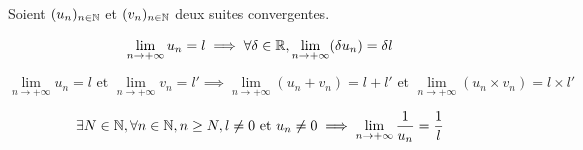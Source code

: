 \documentclass[a4paper, 12pt]{article}
\begin{document}
\begin{proposition}
    Soient $(u_n)_{n \in \mathbb{N}}$ et $(v_n)_{n \in \mathbb{N}}$ deux suites convergentes.

    \item
    $$
    \lim_{n \to +\infty} u_n = l \implies \forall \delta \in \mathbb{R}, \lim_{n \to +\infty}(\delta u_n) = \delta l
    $$
    
    \item
    $$
    \lim_{n \to +\infty} u_n = l \text{ et } \lim_{n \to +\infty} v_n = l' \implies \lim_{n \to +\infty}(u_n + v_n) = l + l' \text{ et } \lim_{n \to +\infty}(u_n \times v_n) = l \times l'
    $$
    
    \item
    $$
    \exists N \in \mathbb{N}, \forall n \in \mathbb{N}, n \geq N, l \neq 0 \text{ et } u_n \neq 0 \implies \lim_{n \to +\infty} \dfrac{1}{u_n}=\dfrac{1}{l}
    $$
\end{proposition}
\end{document}
